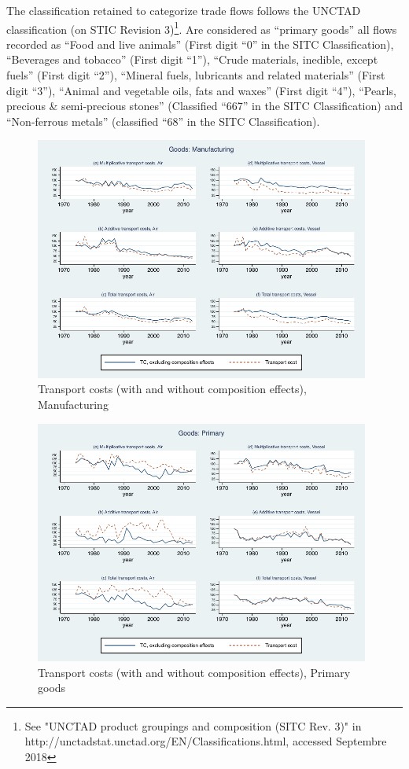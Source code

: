 \documentclass[11pt,twoside, authoryear]{elsarticle}
\begin{document}
The classification retained to categorize trade flows follows the UNCTAD classification (on STIC Revision 3)\footnote{See "UNCTAD product groupings and composition (SITC Rev. 3)" in http://unctadstat.unctad.org/EN/Classifications.html, accessed Septembre 2018}.
Are considered as ``primary goods'' all flows recorded as ``Food and live animals'' (First digit ``0'' in the SITC Classification), ``Beverages and tobacco'' (First digit ``1''), ``Crude materials, inedible, except fuels'' (First digit ``2''), ``Mineral fuels, lubricants and related materials'' (First digit ``3''), ``Animal and vegetable oils, fats and waxes'' (First digit ``4''), ``Pearls, precious \& semi-precious stones'' (Classified ``667'' in the SITC Classification) and ``Non-ferrous metals'' (classified ``68'' in the SITC Classification).


\begin{figure}[htbp]
\caption{Transport costs (with and without composition effects), Manufacturing}
\label{fig:totalTC_compeffects_excl_manuf}
\begin{center}
\includegraphics[height=8cm] {graph_composition_manuf.pdf}
\end{center}
\end{figure}

\begin{figure}[htbp]
\caption{Transport costs (with and without composition effects), Primary goods}
\label{fig:totalTC_compeffects_excl_primary}
\begin{center}
\includegraphics[height=8cm]
{graph_composition_primary.pdf}
\end{center}
\end{figure}
\end{document}
